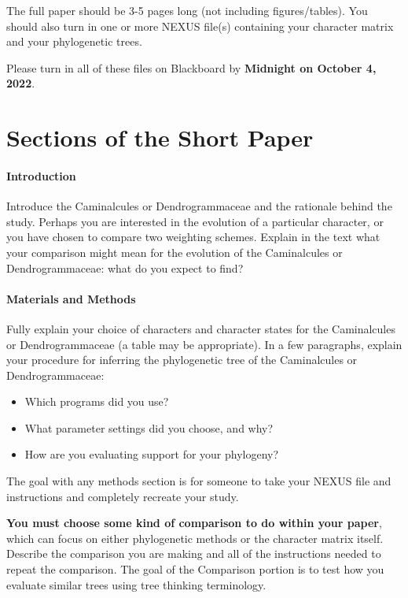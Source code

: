 \documentclass[12pt]{article}
\begin{document}
The full paper should be 3-5 pages long (not including figures/tables).
You should also turn in one or more NEXUS file(s) containing your character matrix and your phylogenetic trees.

Please turn in all of these files on Blackboard by \textbf{Midnight on October 4, 2022}.

\section{Sections of the Short Paper}

\paragraph{Introduction}
Introduce the Caminalcules or Dendrogrammaceae and the rationale behind the study. 
Perhaps you are interested in the evolution of a particular character, or you have chosen to compare two weighting schemes.
Explain in the text what your comparison might mean for the evolution of the Caminalcules or Dendrogrammaceae: what do you expect to find?

\paragraph{Materials and Methods}
Fully explain your choice of characters and character states for the Caminalcules or Dendrogrammaceae (a table may be appropriate).
In a few paragraphs, explain your procedure for inferring the phylogenetic tree of the Caminalcules or Dendrogrammaceae:
\begin{itemize}
\item Which programs did you use? 
\item What parameter settings did you choose, and why?
\item How are you evaluating support for your phylogeny?
\end{itemize}

The goal with any methods section is for someone to take your NEXUS file and instructions and completely recreate your study.

\textbf{You must choose some kind of comparison to do within your paper}, which can focus on either phylogenetic methods or the character matrix itself.
Describe the comparison you are making and all of the instructions needed to repeat the comparison.
The goal of the Comparison portion is to test how you evaluate similar trees using tree thinking terminology.
\end{document}
